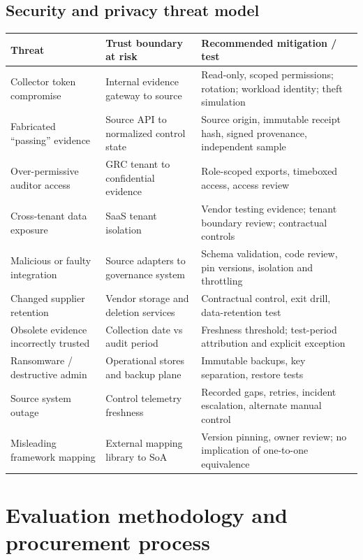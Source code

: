 \documentclass[10pt,letterpaper]{article}
\begin{document}
\subsection{Security and privacy threat model}
\small

\begin{longtable}{@{}L{1.45in}L{2.05in}L{2.78in}@{}}
\toprule
\textbf{Threat} & \textbf{Trust boundary at risk} & \textbf{Recommended mitigation / test}\\\midrule\endhead
Collector token compromise & Internal evidence gateway to source & Read-only, scoped permissions; rotation; workload identity; theft simulation\\
Fabricated ``passing'' evidence & Source API to normalized control state & Source origin, immutable receipt hash, signed provenance, independent sample\\
Over-permissive auditor access & GRC tenant to confidential evidence & Role-scoped exports, timeboxed access, access review\\
Cross-tenant data exposure & SaaS tenant isolation & Vendor testing evidence; tenant boundary review; contractual controls\\
Malicious or faulty integration & Source adapters to governance system & Schema validation, code review, pin versions, isolation and throttling\\
Changed supplier retention & Vendor storage and deletion services & Contractual control, exit drill, data-retention test\\
Obsolete evidence incorrectly trusted & Collection date vs audit period & Freshness threshold; test-period attribution and explicit exception\\
Ransomware / destructive admin & Operational stores and backup plane & Immutable backups, key separation, restore tests\\
Source system outage & Control telemetry freshness & Recorded gaps, retries, incident escalation, alternate manual control\\
Misleading framework mapping & External mapping library to SoA & Version pinning, owner review; no implication of one-to-one equivalence\\
\bottomrule
\end{longtable}
\normalsize

\section{Evaluation methodology and procurement process}
\end{document}
